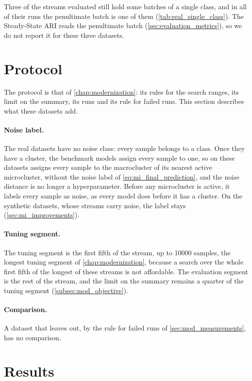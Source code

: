 Three of the streams evaluated still hold some batches of a single class, and in all of their runs the penultimate batch is one of them (\cref{tab:real_single_class}). The Steady-State ARI reads the penultimate batch (\cref{sec:evaluation_metrics}), so we do not report it for these three datasets.

\section{Protocol}
\label{sec:real_protocol}

The protocol is that of \cref{chap:modernization}: its rules for the search ranges, its limit on the summary, its runs and its rule for failed runs. This section describes what these datasets add.

\paragraph{Noise label.} The real datasets have no noise class: every sample belongs to a class. Once they have a cluster, the benchmark models assign every sample to one, so on these datasets \MicroTEDAClusPlus assigns every sample to the macrocluster of its nearest active microcluster, without the noise label of \cref{eq:mi_final_prediction}, and the noise distance is no longer a hyperparameter. Before any microcluster is active, it labels every sample as noise, as every model does before it has a cluster. On the synthetic datasets, whose streams carry noise, the label stays (\cref{sec:mi_improvements}).

\paragraph{Tuning segment.} The tuning segment is the first fifth of the stream, up to 10000 samples, the longest tuning segment of \cref{chap:modernization}, because a search over the whole first fifth of the longest of these streams is not affordable. The evaluation segment is the rest of the stream, and the limit on the summary remains a quarter of the tuning segment (\cref{subsec:mod_objective}).

\paragraph{Comparison.} A dataset that leaves \MicroTEDAClusPlus out, by the rule for failed runs of \cref{sec:mod_measurements}, has no comparison.

\section{Results}
\label{sec:real_results}

